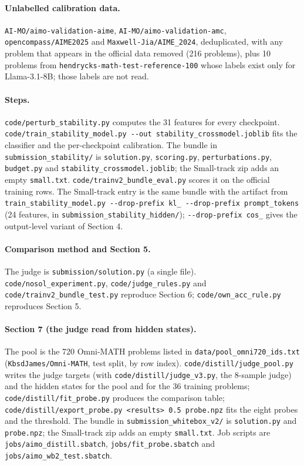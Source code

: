 \documentclass{article}
\begin{document}
\paragraph{Unlabelled calibration data.} \texttt{AI-MO/aimo-validation-aime}, \texttt{AI-MO/aimo-validation-amc}, \texttt{opencompass/AIME2025} and \texttt{Maxwell-Jia/AIME\_2024}, deduplicated, with any problem that appears in the official data removed (216 problems), plus 10 problems from \texttt{hendrycks-math-test-reference-100} whose labels exist only for Llama-3.1-8B; those labels are not read.

\paragraph{Steps.} \texttt{code/perturb\_stability.py} computes the 31 features for every checkpoint. \texttt{code/train\_stability\_model.py\ -\/-out\ stability\_crossmodel.joblib} fits the classifier and the per-checkpoint calibration. The bundle in \texttt{submission\_stability/} is \texttt{solution.py}, \texttt{scoring.py}, \texttt{perturbations.py}, \texttt{budget.py} and \texttt{stability\_crossmodel.joblib}; the Small-track zip adds an empty \texttt{small.txt}. \texttt{code/trainv2\_bundle\_eval.py} scores it on the official training rows. The Small-track entry is the same bundle with the artifact from \texttt{train\_stability\_model.py\ -\/-drop-prefix\ kl\_\ -\/-drop-prefix\ prompt\_tokens} (24 features, in \texttt{submission\_stability\_hidden/}); \texttt{-\/-drop-prefix\ cos\_} gives the output-level variant of Section 4.

\paragraph{Comparison method and Section 5.} The judge is \texttt{submission/solution.py} (a single file). \texttt{code/nosol\_experiment.py}, \texttt{code/judge\_rules.py} and \texttt{code/trainv2\_bundle\_test.py} reproduce Section 6; \texttt{code/own\_acc\_rule.py} reproduces Section 5.

\paragraph{Section 7 (the judge read from hidden states).} The pool is the 720 Omni-MATH problems listed in \texttt{data/pool\_omni720\_ids.txt} (\texttt{KbsdJames/Omni-MATH}, test split, by row index). \texttt{code/distill/judge\_pool.py} writes the judge targets (with \texttt{code/distill/judge\_v3.py}, the 8-sample judge) and the hidden states for the pool and for the 36 training problems; \texttt{code/distill/fit\_probe.py} produces the comparison table; \texttt{code/distill/export\_probe.py\ \textless{}results\textgreater{}\ 0.5\ probe.npz} fits the eight probes and the threshold. The bundle in \texttt{submission\_whitebox\_v2/} is \texttt{solution.py} and \texttt{probe.npz}; the Small-track zip adds an empty \texttt{small.txt}. Job scripts are \texttt{jobs/aimo\_distill.sbatch}, \texttt{jobs/fit\_probe.sbatch} and \texttt{jobs/aimo\_wb2\_test.sbatch}.
\end{document}
